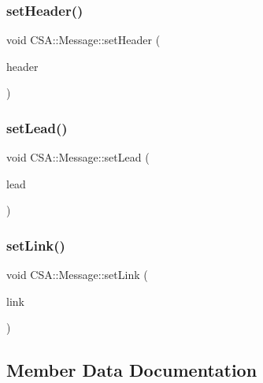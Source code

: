 \subsubsection{\texorpdfstring{set\+Header()}{setHeader()}}
{\footnotesize\ttfamily void C\+S\+A\+::\+Message\+::set\+Header (\begin{DoxyParamCaption}\item[{const Q\+String \&}]{header }\end{DoxyParamCaption})}

\mbox{\label{classCSA_1_1Message_aa70caaac5d69af259fb838f0dd6fde01}} 
\subsubsection{\texorpdfstring{set\+Lead()}{setLead()}}
{\footnotesize\ttfamily void C\+S\+A\+::\+Message\+::set\+Lead (\begin{DoxyParamCaption}\item[{const Q\+String \&}]{lead }\end{DoxyParamCaption})}

\mbox{\label{classCSA_1_1Message_aa5443c2828acafd1b31d9c042dbc52f1}} 
\subsubsection{\texorpdfstring{set\+Link()}{setLink()}}
{\footnotesize\ttfamily void C\+S\+A\+::\+Message\+::set\+Link (\begin{DoxyParamCaption}\item[{const Q\+Url \&}]{link }\end{DoxyParamCaption})}



\subsection{Member Data Documentation}
\mbox{\label{classCSA_1_1Message_ae91f8d05186178670a26d8acf9279b14}} 
